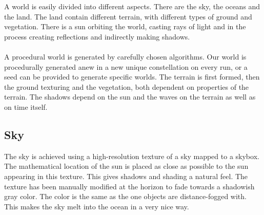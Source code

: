 
A world is easily divided into different aspects. There are the sky, the oceans and the land. The land contain different terrain, with different types of ground and vegetation. There is a sun orbiting the world, casting rays of light and in the process creating reflections and indirectly making shadows.\\
\\
A procedural world is generated by carefully chosen algorithms. Our world is procedurally generated anew in a new unique constellation on every run, or a seed can be provided to generate specific worlds. The terrain is first formed, then the ground texturing and the vegetation, both dependent on properties of the terrain. The shadows depend on the sun and the waves on the terrain as well as on time itself.

\subsection{Sky}
The sky is achieved using a high-resolution texture of a sky mapped to a skybox. The mathematical location of the sun is placed as close as possible to the sun appearing in this texture. This gives shadows and shading a natural feel. The texture has been manually modified at the horizon to fade towards a shadowish gray color. The color is the same as the one objects are distance-fogged with. This makes the sky melt into the ocean in a very nice way. 

